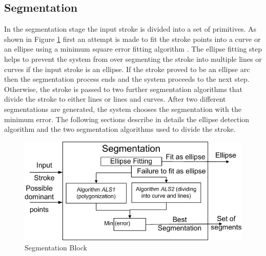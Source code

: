 \documentclass[preprint,1p,times,review]{elsarticle}
\begin{document}




\subsection{Segmentation}
\label{seg}
In the segmentation stage the input stroke is divided into a set of primitives.
As shown in Figure \ref{fig:segblock} first an attempt is made to fit the stroke
points into a curve or an ellipse using a minimum square error fitting algorithm
\cite{ellipsefit}. The ellipse fitting step helps to prevent the system from
over segmenting the stroke into multiple lines or curves if the input stroke is
an ellipse. If the stroke proved to be an ellipse arc then the segmentation
process ends and the system proceeds to the next step. Otherwise, the stroke is
passed to two further segmentation algorithms that divide the stroke to either
lines or lines and curves. After two different segmentations are generated, the
system chooses the segmentation with the minimum error. The following sections
describe in details the ellipse detection algorithm and the two segmentation
algorithms used to divide the stroke.

 \begin{figure}
	\centering
		\includegraphics[scale=0.48]{blockSmall.jpg}
	\caption{Segmentation Block}
	\label{fig:segblock}
\end{figure}
\end{document}
